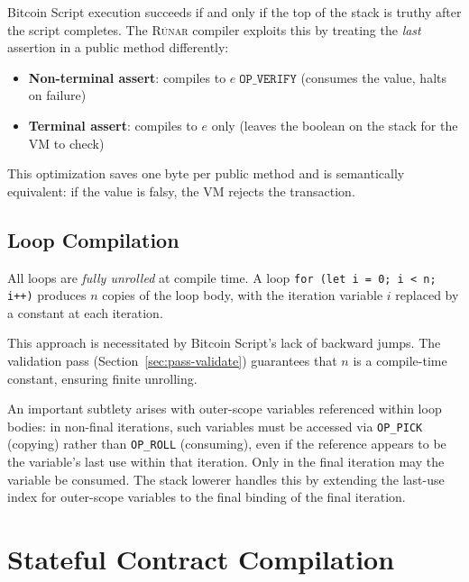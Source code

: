 \documentclass[11pt,a4paper]{article}
\newcommand{\op}[1]{\texttt{OP\_#1}}
\newcommand{\runar}{\textsc{Rúnar}}
\begin{document}
Bitcoin Script execution succeeds if and only if the top of the stack is
truthy after the script completes. The \runar{} compiler exploits this by
treating the \emph{last} assertion in a public method differently:

\begin{itemize}[nosep]
  \item \textbf{Non-terminal assert}: compiles to $e\; \op{VERIFY}$
    (consumes the value, halts on failure)
  \item \textbf{Terminal assert}: compiles to $e$ only (leaves the
    boolean on the stack for the VM to check)
\end{itemize}

This optimization saves one byte per public method and is semantically
equivalent: if the value is falsy, the VM rejects the transaction.

\subsection{Loop Compilation}
\label{sec:codegen-loops}

All loops are \emph{fully unrolled} at compile time. A loop
\texttt{for (let i = 0; i < n; i++)} produces $n$ copies of the loop body,
with the iteration variable $i$ replaced by a constant at each iteration.

This approach is necessitated by Bitcoin Script's lack of backward jumps.
The validation pass (Section~\ref{sec:pass-validate}) guarantees that $n$ is
a compile-time constant, ensuring finite unrolling.

An important subtlety arises with outer-scope variables referenced within
loop bodies: in non-final iterations, such variables must be accessed via
\op{PICK} (copying) rather than \op{ROLL} (consuming), even if the reference
appears to be the variable's last use within that iteration. Only in the
final iteration may the variable be consumed. The stack lowerer handles this
by extending the last-use index for outer-scope variables to the final
binding of the final iteration.

\section{Stateful Contract Compilation}
\label{sec:stateful}
\end{document}
